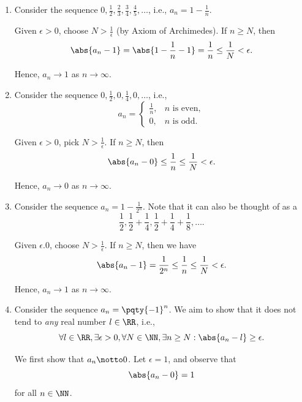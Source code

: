\begin{examples}
    \begin{enumerate}
        \item Consider the sequence \(0, \frac{1}{2}, \frac{2}{3}, \frac{3}{4}, \frac{4}{5}, \ldots\), i.e., \(a_n = 1 - \frac{1}{n}\).
        
        Given \(\epsilon > 0\), choose \(N > \frac{1}{\epsilon}\) (by Axiom of Archimedes). If \(n \geq N\), then
        \[
            \abs{a_n - 1} = \abs{1 - \frac{1}{n} - 1} = \frac{1}{n} \leq \frac{1}{N} < \epsilon.
        \]

        Hence, \(a_n \to 1\) as \(n \to \infty\).

        \item Consider the sequence \(0, \frac{1}{2}, 0, \frac{1}{4}, 0, \ldots\), i.e.,
        \[
            a_n = \begin{cases}
                \frac{1}{n}, & n \text{ is even},\\
                0, & n \text{ is odd}.
            \end{cases}
        \]

        Given \(\epsilon > 0\), pick \(N > \frac{1}{\epsilon}\). If \(n \geq N\), then
        \[
            \abs{a_n - 0} \leq \frac{1}{n} \leq \frac{1}{N} < \epsilon.
        \]

        Hence, \(a_n \to 0\) as \(n \to \infty\).

        \item Consider the sequence \(a_n = 1 - \frac{1}{2^n}\). Note that it can also be thought of as a 
        \[
            \frac{1}{2}, \frac{1}{2} + \frac{1}{4}, \frac{1}{2} + \frac{1}{4} + \frac{1}{8}, \ldots.  
        \]

        Given \(\epsilon . 0\), choose \(N > \frac{1}{\epsilon}\). If \(n \geq N\), then we have
        \[
            \abs{a_n - 1} = \frac{1}{2^n} \leq \frac{1}{n} \leq \frac{1}{N} < \epsilon.
        \]

        Hence, \(a_n \to 1\) as \(n \to \infty\).

        \item Consider the sequence \(a_n = \pqty{-1}^n\). We aim to show that it does not tend to \emph{any} real number \(l \in \RR\), i.e.,
        \[
            \forall l \in \RR, \exists \epsilon > 0, \forall N \in \NN, \exists n \geq N: \abs{a_n - l} \geq \epsilon.
        \]

        We first show that \(a_n \notto 0\). Let \(\epsilon = 1\), and observe that
        \[
            \abs{a_n - 0} = 1
        \]
        for all \(n \in \NN\).


\end{enumerate}
\end{examples}
